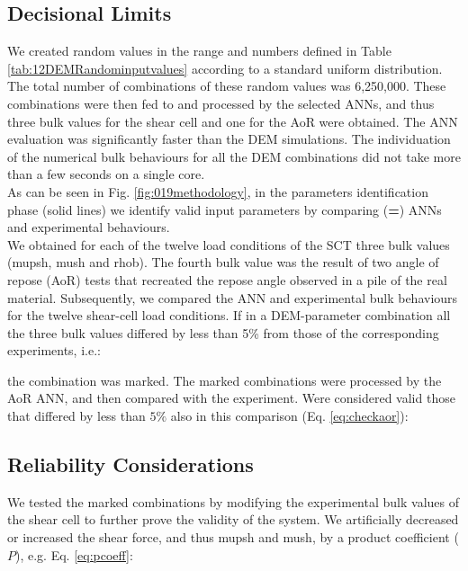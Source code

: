 

\subsection{Decisional Limits}
\label{subsec:decisionallimits}

We created random values
in the range and numbers defined in Table \ref{tab:12DEMRandominputvalues}
according to a standard uniform distribution.
The total number of combinations of these random values was 6,250,000.
These combinations were then fed to and processed by the selected
\acs{ANNs}, and thus three bulk values for the shear
cell and one for the \acs{AoR} were obtained.
The \acs{ANN} evaluation was significantly faster than the \acs{DEM} simulations. The
individuation of the numerical bulk behaviours for all the \acs{DEM} combinations
did not take more than a few seconds on a single core.\\

As can be seen in Fig. \ref{fig:019methodology}, in the parameters
identification phase (solid lines) we identify valid input parameters by comparing (\textbf{=}) \acs{ANNs} and
experimental behaviours.\\
We obtained for each of the twelve load conditions of the \acs{SCT} three bulk
values (\acs{mupsh}, \acs{mush} and \acs{rhob}).
The fourth bulk value was the result of two angle of repose (\acs{AoR}) tests that
recreated the repose angle observed in a pile of the
real material. 
Subsequently, we compared the \acs{ANN} and experimental bulk behaviours for the
twelve shear-cell load conditions.
If in a DEM-parameter combination all the three bulk values differed by less 
than 5\% from those of the corresponding experiments, i.e.:

the combination was marked. The marked combinations were processed by the
\acs{AoR} \acs{ANN}, and then compared with the experiment.
Were considered valid those that differed by less than $5\%$ also in this
comparison (Eq. \ref{eq:checkaor}):


\subsection{Reliability Considerations}
\label{subsec:reliabilityconsiderations}

We tested the marked combinations
by modifying the experimental bulk values of the shear cell to further prove
the validity of the system.
We artificially decreased or increased the shear force, and thus \acs{mupsh} and
\acs{mush}, by a product coefficient ($P$), e.g. Eq. \ref{eq:pcoeff}:


